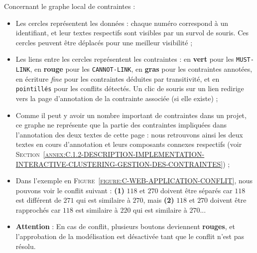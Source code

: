 			Concernant le graphe local de contraintes :
			\begin{itemize}
				\item Les cercles représentent les données : chaque numéro correspond à un identifiant, et leur textes respectifs sont visibles par un survol de souris.
				Ces cercles peuvent être déplacés pour une meilleur visibilité ;
				\item Les liens entre les cercles représentent les contraintes : en \textcolor{colorApplicationMUSTLINK}{\textbf{vert}} pour les \texttt{MUST-LINK}, en \textcolor{colorApplicationCANNOTLINK}{\textbf{rouge}} pour les \texttt{CANNOT-LINK}, en \textbf{gras} pour les contraintes annotées, en écriture \textit{fine} pour les contraintes déduites par transitivité, et en \texttt{pointillés} pour les conflits détectés.
				Un clic de souris sur un lien redirige vers la page d'annotation de la contrainte associée (si elle existe) ;
				\item Comme il peut y avoir un nombre important de contraintes dans un projet, ce graphe ne représente que la partie des contraintes impliquées dans l'annotation des deux textes de cette page : nous retrouvons ainsi les deux textes en cours d'annotation et leurs composants connexes respectifs (voir \textsc{Section~\ref{annex:C.1.2-DESCRIPTION-IMPLEMENTATION-INTERACTIVE-CLUSTERING-GESTION-DES-CONTRAINTES}}) ;
				\item Dans l'exemple en \textsc{Figure~\ref{figure:C-WEB-APPLICATION-CONFLIT}}, nous pouvons voir le conflit suivant : \textbf{(1)} $118$ et $270$ doivent être séparés car $118$ est différent de $271$ qui est similaire à $270$, mais \textbf{(2)} $118$ et $270$ doivent être rapprochés car $118$ est similaire à $220$ qui est similaire à $270$...
				\item \textbf{Attention} : En cas de conflit, plusieurs boutons deviennent \textcolor{colorApplicationERROR}{\textbf{rouges}}, et l'approbation de la modélisation est désactivée tant que le conflit n'est pas résolu.
			\end{itemize}